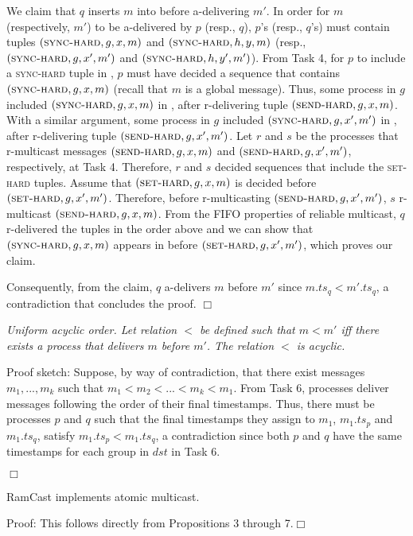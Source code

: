 We claim that $q$ inserts $m$ into \Buffer before a-delivering $m'$. 
In order for $m$ (respectively, $m'$) to be a-delivered by $p$ (resp., $q$), $p$'s (resp., $q$'s) \Buffer must contain tuples $(\textsc{sync-hard}, g, x, m)$ and $(\textsc{sync-hard}, h, y, m)$ (resp., $(\textsc{sync-hard}, g, x', m')$ and $(\textsc{sync-hard}, h, y', m')$).
From Task 4, for $p$ to include a \textsc{sync-hard} tuple in \Buffer, $p$ must have decided a sequence that contains $(\textsc{sync-hard}, g, x, m)$ (recall that $m$ is a global message).
Thus, some process in $g$ included $(\textsc{sync-hard}, g, x, m)$ in \Pend, after r-delivering tuple  $(\textsc{send-hard}, g, x, m)$.
With a similar argument, some process in $g$ included $(\textsc{sync-hard}, g, x', m')$ in \Pend, after r-delivering tuple $(\textsc{send-hard}, g, x', m')$.
Let $r$ and $s$ be the processes that r-multicast messages $(\textsc{send-hard}, g, x, m)$ and $(\textsc{send-hard}, g, x', m')$, respectively, at Task 4.
Therefore, $r$ and $s$ decided sequences that include the \textsc{set-hard} tuples.
Assume that $(\textsc{set-hard}, g, x, m)$ is decided before $(\textsc{set-hard}, g, x', m')$.
Therefore, before r-multicasting $(\textsc{send-hard}, g, x', m')$, $s$ r-multicast $(\textsc{send-hard}, g, x, m)$.
From the FIFO properties of reliable multicast, $q$ r-delivered the tuples in the order above and we can show that $(\textsc{sync-hard}, g, x, m)$ appears in \Buffer before $(\textsc{set-hard}, g, x', m')$, which proves our claim.

Consequently, from the claim, $q$ a-delivers $m$ before $m'$ since $m.ts_q < m'.ts_q$, a contradiction that concludes the proof.
\hfill$\Box$

\begin{proposition}
\textit{Uniform acyclic order.
Let relation $<$ be defined such that $m < m'$ iff there exists a process that delivers $m$ before $m'$.
The relation $<$ is acyclic.}
\end{proposition}
\noindent
{\sc Proof sketch:} 
Suppose, by way of contradiction, that there exist messages $m_1, ..., m_k$ such that $m_1 < m_2 < ... < m_k < m_1$. 
From Task 6, processes deliver messages following the order of their final timestamps.
Thus, there must be processes $p$ and $q$ such that the final timestamps they assign to $m_1$, $m_1.ts_p$ and  $m_1.ts_q$, satisfy $m_1.ts_p < m_1.ts_q$, a contradiction since both $p$ and $q$ have the same timestamps for each group in $dst$ in Task 6.


\hfill$\Box$

\begin{theorem}
RamCast implements atomic multicast.
\end{theorem}
\noindent
{\sc Proof:} 
This follows directly from Propositions 3 through 7.\hfill$\Box$

